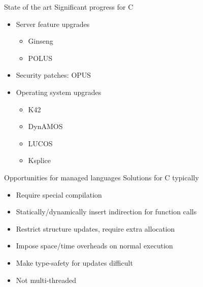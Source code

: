 \begin{frame}{State of the art}%
Significant progress for C
\begin{itemize}
\item Server feature upgrades
  \begin{itemize}
  \item Ginseng \cite{neamtiu06dsu}
  \item POLUS \cite{chen:icse07}
  \end{itemize}
\item Security patches: OPUS \cite{altekar05opus}
\item Operating system upgrades
  \begin{itemize}
  \item K42 \cite{K42reconfig}
  \item DynAMOS \cite{dynamos_eurosys_07}
  \item LUCOS \cite{chen06vee}
  \item Ksplice \cite{Ksplice}
  \end{itemize}
\end{itemize}
\end{frame}

\begin{frame}{Opportunities for managed languages}%
Solutions for C typically
\begin{itemize}
\item Require special compilation
\item Statically/dynamically insert indirection for function calls
\item Restrict structure updates, require extra allocation
\item Impose space/time overheads on normal execution
\item Make type-safety for updates difficult
\item Not multi-threaded
\end{itemize}
\end{frame}

